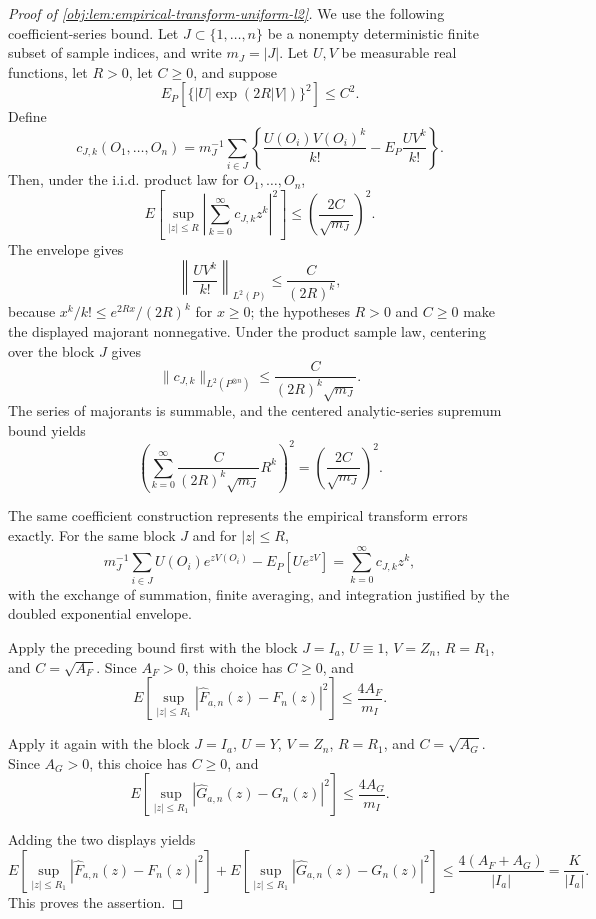 \documentclass[11pt]{article}
\begin{document}
\begin{proof}[Proof of \cref{obj:lem:empirical-transform-uniform-l2}]
We use the following coefficient-series bound. Let \(J\subset\{1,\ldots,n\}\)
be a nonempty deterministic finite subset of sample indices, and write
\(m_J=|J|\). Let \(U,V\) be measurable real functions, let \(R>0\), let
\(C\ge0\), and suppose
\[
E_P\left[\{|U|\exp(2R|V|)\}^2\right]\le C^2.
\]
Define
\[
c_{J,k}(O_1,\ldots,O_n)
=
m_J^{-1}\sum_{i\in J}
\left\{
\frac{U(O_i)V(O_i)^k}{k!}
-
E_P\frac{UV^k}{k!}
\right\}.
\]
Then, under the i.i.d. product law for \(O_1,\ldots,O_n\),
\[
E\left[
\sup_{|z|\le R}
\left|\sum_{k=0}^{\infty} c_{J,k} z^k\right|^2
\right]
\le
\left(\frac{2C}{\sqrt{m_J}}\right)^2.
\]
The envelope gives
\[
\left\|
\frac{UV^k}{k!}
\right\|_{L^2(P)}
\le
\frac{C}{(2R)^k},
\]
because \(x^k/k!\le e^{2Rx}/(2R)^k\) for \(x\ge0\); the hypotheses
\(R>0\) and \(C\ge0\) make the displayed majorant nonnegative. Under the
product sample law, centering over the block \(J\) gives
\[
\|c_{J,k}\|_{L^2(P^{\otimes n})}
\le
\frac{C}{(2R)^k\sqrt{m_J}}.
\]
The series of majorants is summable, and the centered analytic-series supremum
bound yields
\[
\left(
\sum_{k=0}^{\infty}
\frac{C}{(2R)^k\sqrt{m_J}}R^k
\right)^2
=
\left(\frac{2C}{\sqrt{m_J}}\right)^2.
\]

The same coefficient construction represents the empirical transform errors
exactly. For the same block \(J\) and for \(|z|\le R\),
\[
m_J^{-1}\sum_{i\in J}U(O_i)e^{zV(O_i)}
-
E_P[Ue^{zV}]
=
\sum_{k=0}^{\infty}c_{J,k} z^k,
\]
with the exchange of summation, finite averaging, and integration justified by
the doubled exponential envelope. %

Apply the preceding bound first with the block \(J=I_a\), \(U\equiv1\),
\(V=Z_n\), \(R=R_1\), and \(C=\sqrt{A_F}\). Since \(A_F>0\), this choice has
\(C\ge0\), and
\[
E\left[
\sup_{|z|\le R_1}
|\widehat F_{a,n}(z)-F_n(z)|^2
\right]
\le
\frac{4A_F}{m_I}.
\]

Apply it again with the block \(J=I_a\), \(U=Y\), \(V=Z_n\), \(R=R_1\), and
\(C=\sqrt{A_G}\). Since \(A_G>0\), this choice has \(C\ge0\), and
\[
E\left[
\sup_{|z|\le R_1}
|\widehat G_{a,n}(z)-G_n(z)|^2
\right]
\le
\frac{4A_G}{m_I}.
\]

Adding the two displays yields
\[
E\left[\sup_{|z|\le R_1}|\widehat F_{a,n}(z)-F_n(z)|^2\right]
+
E\left[\sup_{|z|\le R_1}|\widehat G_{a,n}(z)-G_n(z)|^2\right]
\le
\frac{4(A_F+A_G)}{|I_a|}
=
\frac{K}{|I_a|}.
\]
This proves the assertion. %
\end{proof}
\end{document}
